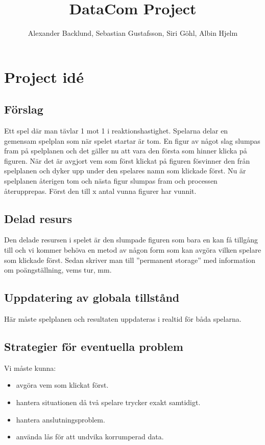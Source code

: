 \documentclass[a4paper]{article}
\title{DataCom Project}
\author{Alexander Backlund, Sebastian Gustafsson, Siri Göhl, Albin Hjelm}
\begin{document}
\maketitle
\newpage

\section{Project idé}
\subsection{Förslag}
Ett spel där man tävlar 1 mot 1 i reaktionshastighet. Spelarna delar en gemensam
spelplan som när spelet startar är tom. En figur av något slag slumpas fram på
spelplanen och det gäller nu att vara den första som hinner klicka på figuren.
När det är avgjort vem som först klickat på figuren fösvinner den från spelplanen och
dyker upp under den spelares namn som klickade först. Nu är spelplanen återigen tom
och nästa figur slumpas fram och processen återupprepas. Först den till x antal vunna
figurer har vunnit.

\subsection{Delad resurs}
Den delade resursen i spelet är den slumpade figuren som bara en kan få tillgång till
och vi kommer behöva en metod av någon form som kan avgöra vilken spelare som
klickade först. Sedan skriver man till ”permanent storage” med information om
poängställning, vems tur, mm.

\subsection{Uppdatering av globala tillstånd}
Här måste spelplanen och resultaten uppdateras i realtid för båda spelarna.

\subsection{Strategier för eventuella problem}
Vi måste kunna:
\begin{itemize}
\item avgöra vem som klickat först.
\item hantera situationen då två spelare trycker exakt samtidigt.
\item hantera anslutningsproblem.
\item använda lås för att undvika korrumperad data.
\end{itemize}
\end{document}

